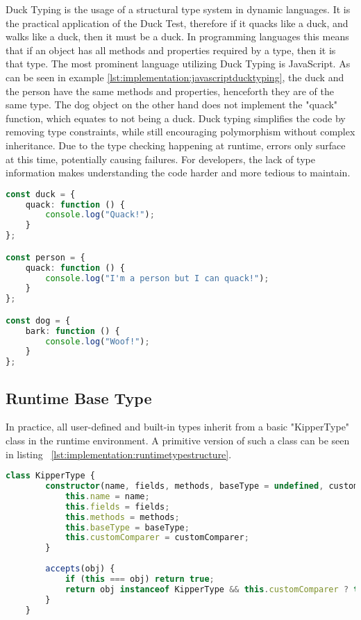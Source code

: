 Duck Typing is the usage of a structural type system in dynamic languages. It is the practical application of the Duck Test, therefore if it quacks like a duck, and walks like a duck, then it must be a duck. In programming languages this means that if an object has all methods and properties required by a type, then it is that type. The most prominent language utilizing Duck Typing is JavaScript. As can be seen in example \ref{lst:implementation:javascriptducktyping}, the duck and the person have the same methods and properties, henceforth they are of the same type. The dog object on the other hand does not implement the "quack" function, which equates to not  being a duck. Duck typing simplifies the code by removing type constraints, while still encouraging polymorphism without complex inheritance. Due to the type checking happening at runtime, errors only surface at this time, potentially causing failures. For developers, the lack of type information makes understanding the code harder and more tedious to maintain.

\begin{lstlisting}[language=Typescript,caption=Example of duck typing in JavaScript,label=lst:implementation:javascriptducktyping]
const duck = {
	quack: function () {
		console.log("Quack!");
	}
};

const person = {
	quack: function () {
		console.log("I'm a person but I can quack!");
	}
};

const dog = {
	bark: function () {
		console.log("Woof!");
	}
};
\end{lstlisting}

\subsection{Runtime Base Type}

In practice, all user-defined and built-in types inherit from a basic "KipperType" class in the runtime environment. A primitive version of such a class can be seen in listing ~\ref{lst:implementation:runtimetypestructure}.

\begin{lstlisting}[language=TypeScript,caption=The structure of a runtime type,label=lst:implementation:runtimetypestructure]
	class KipperType {
		constructor(name, fields, methods, baseType = undefined, customComparer = undefined) {
			this.name = name; 
			this.fields = fields;
			this.methods = methods;
			this.baseType = baseType;
			this.customComparer = customComparer;
		}
		
		accepts(obj) {
			if (this === obj) return true;
			return obj instanceof KipperType && this.customComparer ? this.customComparer(this, obj) : false;
		}
	}
\end{lstlisting}

